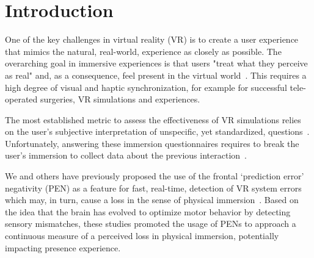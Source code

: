 \section{Introduction} 

One of the key challenges in virtual reality (VR) is to create a user experience that mimics the natural, real-world, experience as closely as possible. The overarching goal in immersive experiences is that users "treat what they perceive as real" and, as a consequence, feel present in the virtual world~\cite{Slater2009-au}. This requires a high degree of visual and haptic synchronization, for example for successful tele-operated surgeries, VR simulations and experiences.

The most established metric to assess the effectiveness of VR simulations relies on the user’s subjective interpretation of unspecific, yet standardized, questions~\cite{Schubert2003-sq, Witmer1998-ew}. Unfortunately, answering these immersion questionnaires requires to break the user’s immersion to collect data about the previous interaction~\cite{Slater1999-dm}. 


We and others have previously proposed the use of the frontal `prediction error' negativity (PEN) as a feature for fast, real-time, detection of VR system errors which may, in turn, cause a loss in the sense of physical immersion~\cite{Gehrke2019-og, Si-mohammed2020-ru, Singh2018-qi}. Based on the idea that the brain has evolved to optimize motor behavior by detecting sensory mismatches, these studies promoted the usage of PENs to approach a continuous measure of a perceived loss in physical immersion, potentially impacting presence experience.

